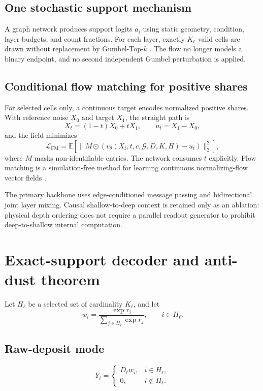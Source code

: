 \documentclass[10pt,a4paper]{article}
\begin{document}
\subsection{One stochastic support mechanism}
A graph network produces support logits $a_i$ using static geometry, condition, layer budgets, and count fractions. For each layer, exactly $K_\ell$ valid cells are drawn without replacement by Gumbel-Top-$k$ \cite{gumbel_topk}. The flow no longer models a binary endpoint, and no second independent Gumbel perturbation is applied.

\subsection{Conditional flow matching for positive shares}
For selected cells only, a continuous target encodes normalized positive shares. With reference noise $X_0$ and target $X_1$, the straight path is
\begin{equation}
 X_t=(1-t)X_0+tX_1,\qquad u_t=X_1-X_0,
\end{equation}
and the field minimizes
\begin{equation}
 \mathcal L_{\mathrm{FM}}=\mathbb E\left[\lVert M\odot(v_\theta(X_t,t,c,\mathcal G,D,K,H)-u_t)\rVert_2^2\right],
 \label{eq:fm}
\end{equation}
where $M$ masks non-identifiable entries. The network consumes $t$ explicitly. Flow matching is a simulation-free method for learning continuous normalizing-flow vector fields \cite{flow_matching}.

The primary backbone uses edge-conditioned message passing and bidirectional joint layer mixing. Causal shallow-to-deep context is retained only as an ablation: physical depth ordering does not require a parallel readout generator to prohibit deep-to-shallow internal computation.

\section{Exact-support decoder and anti-dust theorem}
\label{sec:decoder}

Let $H_\ell$ be a selected set of cardinality $K_\ell$, and let
\begin{equation}
 w_i=\frac{\exp r_i}{\sum_{j\in H_\ell}\exp r_j},\qquad i\in H_\ell.
\end{equation}

\subsection{Raw-deposit mode}
\begin{equation}
 Y_i=\begin{cases}D_\ell w_i,&i\in H_\ell,\\0,&i\notin H_\ell.\end{cases}
 \label{eq:rawdecode}
\end{equation}
\end{document}
